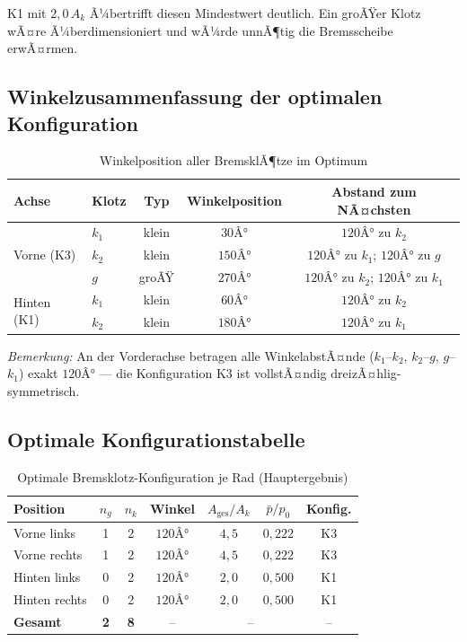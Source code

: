 ﻿\documentclass[12pt,a4paper]{article}
\theoremstyle{definition}
\begin{document}
K1 mit $2{,}0\,A_k$ Ã¼bertrifft diesen Mindestwert deutlich.  Ein groÃŸer
Klotz wÃ¤re Ã¼berdimensioniert und wÃ¼rde unnÃ¶tig die Bremsscheibe erwÃ¤rmen.

\subsection{Winkelzusammenfassung der optimalen Konfiguration}

\begin{table}[H]
  \centering
  \caption{Winkelposition aller BremsklÃ¶tze im Optimum}
  \label{tab:winkel_opt}
  \renewcommand{\arraystretch}{1.5}
  \begin{tabular}{llccc}
    \toprule
    Achse & Klotz & Typ & Winkelposition & Abstand zum NÃ¤chsten \\
    \midrule
    \multirow{3}{*}{Vorne (K3)} & $k_1$ & klein & $30Â°$  & $120Â°$ zu $k_2$  \\
                                & $k_2$ & klein & $150Â°$ & $120Â°$ zu $k_1$; $120Â°$ zu $g$ \\
                                & $g$   & groÃŸ  & $270Â°$ & $120Â°$ zu $k_2$; $120Â°$ zu $k_1$ \\
    \midrule
    \multirow{2}{*}{Hinten (K1)} & $k_1$ & klein & $60Â°$  & $120Â°$ zu $k_2$ \\
                                 & $k_2$ & klein & $180Â°$ & $120Â°$ zu $k_1$ \\
    \bottomrule
  \end{tabular}
\end{table}

\noindent \textit{Bemerkung:} An der Vorderachse betragen alle
WinkelabstÃ¤nde ($k_1$--$k_2$, $k_2$--$g$, $g$--$k_1$) exakt $120Â°$
--- die Konfiguration K3 ist vollstÃ¤ndig dreizÃ¤hlig-symmetrisch.

\subsection{Optimale Konfigurationstabelle}

\begin{table}[H]
  \centering
  \caption{Optimale Bremsklotz-Konfiguration je Rad (Hauptergebnis)}
  \label{tab:optimal}
  \renewcommand{\arraystretch}{1.7}
  \begin{tabular}{lcccccc}
    \toprule
    \textbf{Position} & $n_g$ & $n_k$ & \textbf{Winkel} &
    $A_{\text{ges}}/A_k$ & $\bar{p}/p_0$ & \textbf{Konfig.} \\
    \midrule
    Vorne links  & 1 & 2 & $120Â°$ & $4{,}5$ & $0{,}222$ & K3 \\
    Vorne rechts & 1 & 2 & $120Â°$ & $4{,}5$ & $0{,}222$ & K3 \\
    Hinten links  & 0 & 2 & $120Â°$ & $2{,}0$ & $0{,}500$ & K1 \\
    Hinten rechts & 0 & 2 & $120Â°$ & $2{,}0$ & $0{,}500$ & K1 \\
    \midrule
    \textbf{Gesamt} & \textbf{2} & \textbf{8} & -- & \multicolumn{2}{c}{--} & -- \\
    \bottomrule
  \end{tabular}
\end{table}
\end{document}
